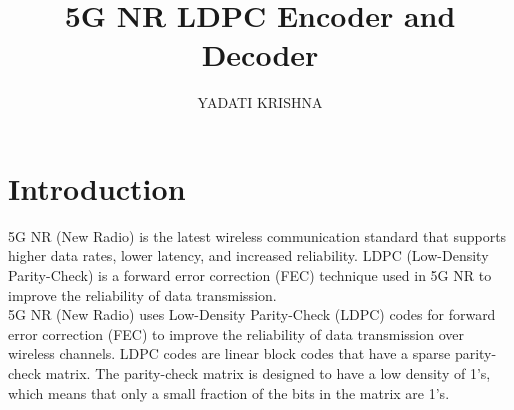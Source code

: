 \documentclass[journal,twocolumn]{IEEEtran}
\renewcommand\thesection{\arabic{section}}
\begin{document}
\DeclarePairedDelimiter{\ceil}{\lceil}{\rceil}
\let\StandardTheFigure\thefigure
\let\StandardTheFigure\thefigure
\let\StandardTheTable\thetable
\let\vec\mathbf
\def\putbox#1#2#3{\makebox[0in][l]{\makebox[#1][l]{}\raisebox{\baselineskip}[0in][0in]{\raisebox{#2}[0in][0in]{#3}}}}
     \def\rightbox#1{\makebox[0in][r]{#1}}
     \def\centbox#1{\makebox[0in]{#1}}
     \def\topbox#1{\raisebox{-\baselineskip}[0in][0in]{#1}}
     \def\midbox#1{\raisebox{-0.5\baselineskip}[0in][0in]{#1}}
\title{ 
5G NR LDPC Encoder and Decoder 
}
\author{YADATI KRISHNA}%
\maketitle
\tableofcontents
\section{\textbf{Introduction}}
5G NR (New Radio) is the latest wireless communication standard that supports higher data rates, lower latency, and increased reliability. LDPC (Low-Density Parity-Check) is a forward error correction (FEC) technique used in 5G NR to improve the reliability of data transmission.\\

5G NR (New Radio) uses Low-Density Parity-Check (LDPC) codes for forward error correction (FEC) to improve the reliability of data transmission over wireless channels. LDPC codes are linear block codes that have a sparse parity-check matrix. The parity-check matrix is designed to have a low density of 1's, which means that only a small fraction of the bits in the matrix are 1's.\\
\end{document}
